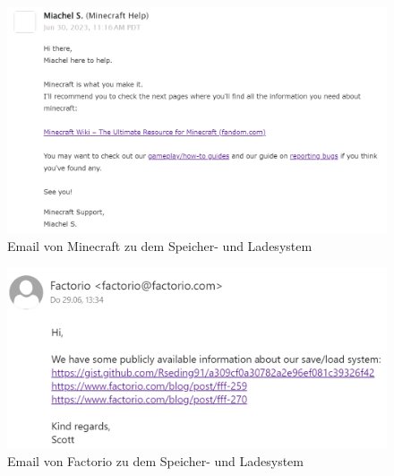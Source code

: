 \begin{figure}[htp]
    \centering
    \includegraphics[width=1\textwidth]{images/Minecraft_Email.png}
    \caption{Email von Minecraft zu dem Speicher- und Ladesystem}
    \label{fig:minecraftMail}
\end{figure}

\begin{figure}[htp]
    \centering
    \includegraphics[width=1\textwidth]{images/Factorio_Email.png}
    \caption{Email von Factorio zu dem Speicher- und Ladesystem}
    \label{fig:factorioMail}
\end{figure}
